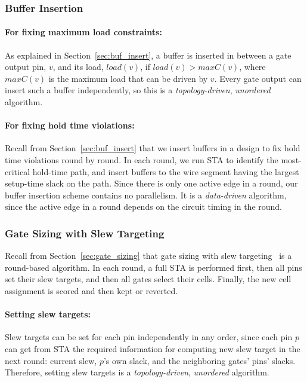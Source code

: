 \subsubsection{Buffer Insertion}

\paragraph{For fixing maximum load constraints:} As explained in Section~\ref{sec:buf_insert}, a buffer is inserted in between a gate output pin, $v$, and its load, $load(v)$, if $load(v) > maxC(v)$, where $maxC(v)$ is the maximum load that can be driven by $v$.
Every gate output can insert such a buffer independently, so this is a {\em topology-driven}, {\em unordered} algorithm.

\paragraph{For fixing hold time violations:} Recall from Section~\ref{sec:buf_insert} that we insert buffers in a design to fix hold time violations round by round. In each round, we run STA to identify the most-critical hold-time path, and insert buffers to the wire segment having the largest setup-time slack on the path. Since there is only one active edge in a round, our buffer insertion scheme contains no parallelism. It is a {\em data-driven} algorithm, since the active edge in a round depends on the circuit timing in the round.

\subsubsection{Gate Sizing with Slew Targeting}

Recall from Section~\ref{sec:gate_sizing} that gate sizing with slew targeting~\cite{Held:Gate} is a round-based algorithm. In each round, a full STA is performed first, then all pins set their slew targets, and then all gates select their cells. Finally, the new cell assignment is scored and then kept or reverted.

\paragraph{Setting slew targets:} Slew targets can be set for each pin independently in any order, since each pin $p$ can get from STA the required information for computing new slew target in the next round: current slew, $p$'s own slack, and the neighboring gates' pins' slacks. Therefore, setting slew targets is a {\em topology-driven}, {\em unordered} algorithm.

